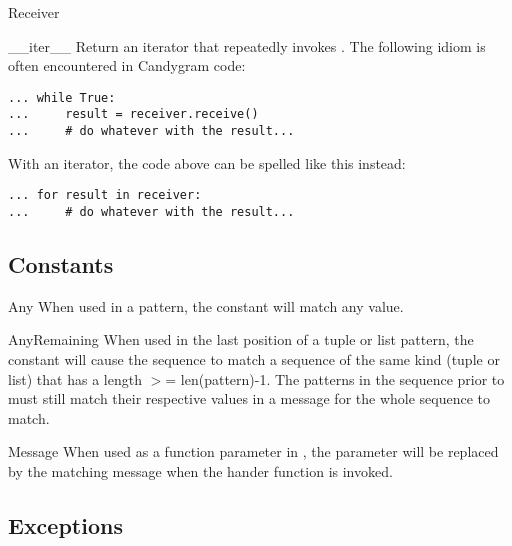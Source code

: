 \documentclass{howto}
\newcommand{\greaterthan}[0]{\begin{math}>\end{math}}
\newcommand{\greaterthan}[0]{>}
\begin{document}
\begin{classdesc}{Receiver}{}
\begin{methoddesc}{__iter__}{}
Return an iterator that repeatedly invokes . The following
idiom is often encountered in Candygram code:
\begin{verbatim}
... while True:
...     result = receiver.receive()
...     # do whatever with the result...
\end{verbatim}
With an iterator, the code above can be spelled like this instead:
\begin{verbatim}
... for result in receiver:
...     # do whatever with the result...
\end{verbatim}
\end{methoddesc}

\end{classdesc}



\subsection{Constants}

\begin{datadesc}{Any}
When used in a pattern, the  constant will match any value.
\end{datadesc}

\begin{datadesc}{AnyRemaining}
When used in the last position of a tuple or list pattern, the
 constant will cause the sequence to match a sequence of
the same kind (tuple or list) that has a length \greaterthan= len(pattern)-1.
The patterns in the sequence prior to  must still match
their respective values in a message for the whole sequence to match.
\end{datadesc}

\begin{datadesc}{Message}
When used as a function parameter in , the
parameter will be replaced by the matching message when the hander function is
invoked.
\end{datadesc}



\subsection{Exceptions}
\end{document}
